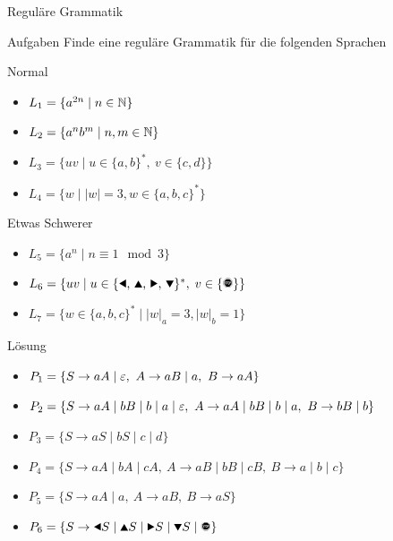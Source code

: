 {
\begin{frame}{Reguläre Grammatik}
    \begin{alertblock}{Aufgaben}
    Finde eine reguläre Grammatik für die folgenden Sprachen
    \end{alertblock}
    \begin{block}{Normal}
    \begin{itemize}
        \item $L_1 = \{a^{2n} \mid n\in\mathbb{N}\}$
        \item $L_2 = \{a^nb^m \mid n, m\in\mathbb{N}\}$
        \item $L_3 = \{uv \mid u\in\{a,b\}^\ast,\ v\in\{c,d\}\}$
        \item $L_4 = \{w \mid |w| = 3, w\in \{a,b,c\}^*\}$
    \end{itemize}
    \end{block}
    \begin{block}{Etwas Schwerer}
    \begin{itemize}
        \item $L_5 = \{a^n \mid n \equiv 1 \mod 3\}$
        \item $L_6 = \{uv\mid u\in\{\text{\Rewind, \MoveUp, \Forward, \MoveDown}\}^\ast,\;v\in\{\text{\Stopsign}\}\}$
        \item $L_7 = \{w \in \{a,b,c\}^* \mid |w|_a = 3, |w|_b = 1\}$
    \end{itemize}
    \end{block}
\end{frame}
}

{
\begin{frame}{Lösung}
    \begin{itemize}
        \item<1-> \alert<1>{$P_1 = \{S \to aA \mid \varepsilon,\ A \to aB \mid a,\ B \to aA\}$}
        \item<2-> \alert<2>{$P_2 = \{S \to aA \mid bB \mid b \mid a \mid \varepsilon,\ A \to aA \mid bB \mid b \mid a ,\ B \to bB \mid b\}$}
        \item<3-> \alert<3>{$P_3 = \{S \to aS \mid bS \mid c \mid d\}$}
        \item<4-> \alert<4>{$P_4 = \{S \to aA \mid bA \mid cA,\ A \to aB \mid bB \mid cB,\ B \to a \mid b \mid c\}$}
        \item<5-> \alert<5>{$P_5 = \{S \to aA \mid a,\ A \to aB,\ B \to aS\}$}
        \item<6-> \alert<6>{$P_6 = \{S \to \text{\Rewind}S \mid \text{\MoveUp}S \mid \text{\Forward}S \mid \text{\MoveDown}S \mid \text{\Stopsign}\}$}
    \end{itemize}
\end{frame}
}

